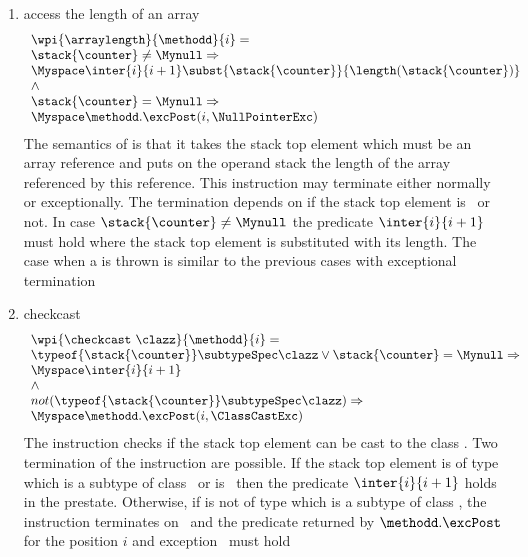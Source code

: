 \begin{itemize}
\begin{enumerate}
					\item access the length of an array 
					$$\begin{array}{l}
					        \wpi{\arraylength } {\methodd}{i}  =  \\
					 				\stack{\counter } \ne \Mynull \Rightarrow \\
									\Myspace \inter{i}{i+1}
									 \subst{ \stack{\counter } }{ \length(\stack{\counter } )  } \\
									 \wedge \\
								\stack{\counter } = \Mynull \Rightarrow \\
								\Myspace   \methodd.\excPost( i, \NullPointerExc) \\
					  \end{array} $$
					  The semantics of \arraylength is that it takes the stack top element which must be an array reference
					  and puts on the operand stack the length of the array referenced by this reference. This instruction
					  may terminate either normally or exceptionally. The termination depends on if the stack top element is 
					  \Mynull \ or not. In case $\stack{\counter} \neq \Mynull$ the predicate  $\inter{i}{i+1}$ must hold where
					  the stack top element is substituted with its length. The case when a \NullPointerExc is thrown is similar
					  to the previous cases with exceptional termination
					  
					  
					\item checkcast 
						$$ \begin{array}{l} 
						\wpi{\checkcast  \ \clazz } {\methodd}{i}  = \\
							\typeof{\stack{\counter}}  \subtypeSpec  \clazz \vee  \stack{\counter} = \Mynull \Rightarrow \\
							     	\Myspace   \inter{i}{i+1}\\
							
							 \wedge \\
							
							not(  \typeof{\stack{\counter}} \subtypeSpec  \clazz  ) \Rightarrow  \\
							\Myspace    \methodd.\excPost( i, \ClassCastExc) \\
						\end{array}$$  
					  The instruction checks if the stack top element can be cast to the class \clazz. 
					  Two termination of the instruction  are possible. If the stack top element \stack{\counter} is of type 
					  which is a subtype of class \clazz \  or is \Mynull \ then the predicate $ \inter{i}{i+1} $ holds in the prestate.
					  Otherwise, if   \stack{\counter} is not of type which is a subtype of class \clazz, the instruction terminates
					  on \ClassCastExc \ and the predicate returned by $\methodd.\excPost$ for the position $i$ and exception \ClassCastExc  \
					  must hold 
					  

\end{enumerate}
\end{itemize}
